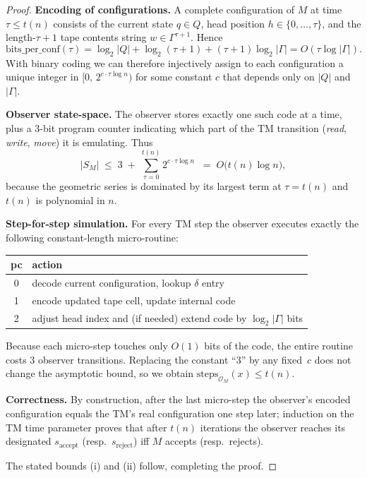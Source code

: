 \documentclass[12pt]{article}
\newcommand{\accept}{\mathrm{accept}}
\newcommand{\reject}{\mathrm{reject}}
\theoremstyle{definition}
\theoremstyle{definition}
\theoremstyle{remark}
\theoremstyle{remark}
\begin{document}
\begin{proof}
\textbf{Encoding of configurations.}
A complete configuration of $M$ at time~$\tau\le t(n)$ consists of
the current state $q\in Q$,
head position $h\in\{0,\dotsc,\tau\}$,
and the length-$\tau+1$ tape contents string
$w\in\Gamma^{\tau+1}$.
Hence
\[
\text{bits\_per\_conf}(\tau)
= \log_2|Q|
  + \log_2(\tau+1)
  + (\tau+1)\log_2|\Gamma|
  = O(\tau\log|\Gamma|).
\]
With binary coding we can therefore injectively assign to each
configuration a unique integer in
$\bigl[0,\,2^{c\cdot\tau\log n}\bigr)$ for some constant $c$ that
depends only on $|Q|$ and $|\Gamma|$.

\textbf{Observer state-space.}
The observer stores exactly one such code at a time,
plus a $3$-bit program counter indicating which part of the TM
transition (\emph{read}, \emph{write}, \emph{move}) it is emulating.
Thus
\[
|S_M|
\;\le\;
3\;+\;\sum_{\tau=0}^{t(n)} 2^{c\cdot\tau\log n}
\;\;=\;O\!\bigl(t(n)\log n\bigr),
\]
because the geometric series is dominated by
its largest term at $\tau=t(n)$ and $t(n)$ is polynomial in $n$.

\textbf{Step-for-step simulation.}
For every TM step the observer executes exactly the following
constant-length micro-routine:

\smallskip
\begin{center}
\begin{tabular}{|c|l|}
\hline
pc & action \\\hline
0 & decode current configuration, lookup $\delta$ entry \\
1 & encode updated tape cell, update internal code \\
2 & adjust head index and (if needed) extend code by
    $\log_2|\Gamma|$ bits \\
\hline
\end{tabular}
\end{center}

\noindent
Because each micro-step touches only $O(1)$ bits of the code,
the entire routine costs $3$ observer transitions.
Replacing the constant ``3'' by any fixed~$c$ does not change the
asymptotic bound, so we obtain
$\mathrm{steps}_{\mathcal O_M}(x)\le t(n)$.

\textbf{Correctness.}
By construction, after the last micro-step the observer's
encoded configuration equals the TM's real configuration one step
later; induction on the TM time parameter proves that after
$t(n)$ iterations the observer reaches its designated
$s_{\accept}$ (resp.~$s_{\reject}$) iff $M$ accepts (resp.\ rejects).

The stated bounds (i) and (ii) follow, completing the proof.
\end{proof}
\end{document}
